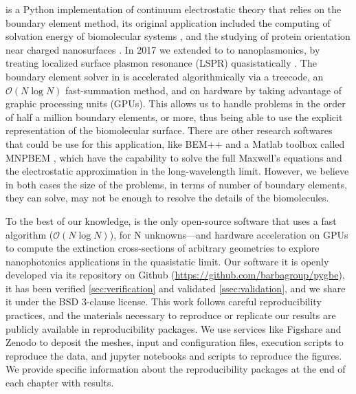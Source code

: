 \pygbe is a Python implementation of continuum electrostatic theory that relies on the boundary element method, its original application included 
the computing of solvation energy of biomolecular systems \cite{CooperBardhanBarba2013}, and the studying of protein orientation near charged nanosurfaces \cite{CooperClementiBarba2015}. In 
2017 we extended \pygbe to to nanoplasmonics, by treating localized surface plasmon resonance (LSPR) quasistatically \cite{ClementiETal2017}. The boundary 
element solver in \pygbe is accelerated algorithmically via a treecode, an $\mathcal{O}(N\log N)$ fast-summation method, and on hardware by taking advantage of 
graphic processing units (GPUs). This allows us to handle problems in the order of half a million boundary elements, or more, thus being able to use the explicit 
representation of the biomolecular surface. There are other research softwares that could be use for this application, like BEM++ \cite{SmigajETal2015} and a Matlab toolbox 
called MNPBEM \cite{HohenesterTrugler2012}, which have the capability to solve the full Maxwell's equations and the electrostatic approximation in the long-wavelength limit. However, 
we believe in both cases the size of the problems, in terms of number of boundary elements, they can solve, may not be enough to resolve the details of the biomolecules. 
 
To the best of our knowledge, \pygbe is the only open-source software that uses a fast algorithm ($\mathcal{O}(N\log N)$),
for N unknowns—and hardware acceleration on GPUs to compute the extinction cross-sections of arbitrary geometries to explore
nanophotonics applications in the quasistatic limit. Our software it is openly developed via its repository on 
Github (\url{https://github.com/barbagroup/pygbe}), it has been verified \ref{sec:verification} and validated \ref{ssec:validation},
and we share it under the BSD 3-clause license.
This work follows careful reproducibility practices, and the materials necessary to reproduce or replicate our results are publicly available in 
reproducibility packages.  We use services like Figshare and Zenodo to deposit the meshes, input and configuration files, execution scripts 
to reproduce the data, and jupyter notebooks and scripts to reproduce the figures. We provide specific information about the reproducibility packages 
at the end of each chapter with results. 
